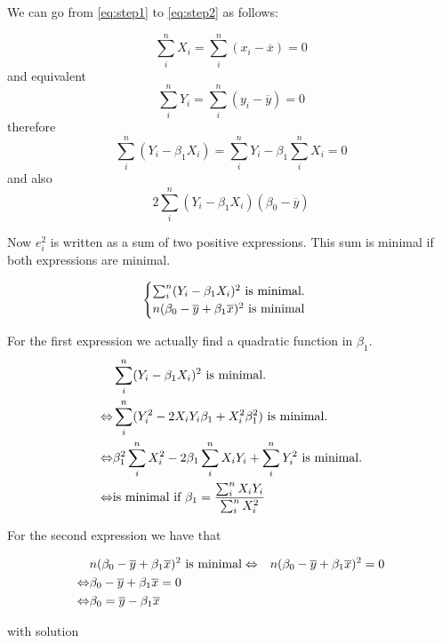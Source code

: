 \begin{theorem}
  We can go from \ref{eq:step1} to \ref{eq:step2} as follows:

  \[ \sum_{i}^{n}X_i = \sum_{i}^{n} (x_i - \overline{x}) = 0 \]
  and equivalent
  \[ \sum_{i}^{n}Y_i = \sum_{i}^{n} (y_i - \overline{y}) = 0 \]
  therefore
  \[ \sum_{i}^{n}(Y_i - \beta_1 X_i) = \sum_{i}^{n}Y_i - \beta_1 \sum_{i}^{n}X_i = 0 \]
  and also
  \[ 2 \sum_{i}^{n}(Y_i - \beta_1 X_i)(\beta_0 - \overline{y}) \]
  

  Now $e^{2}_{i}$ is written as a sum of two positive expressions. This sum is minimal if both expressions are minimal.

  \begin{equation}
    \begin{cases}
      \sum_{i}^{n}( Y_{i} - \beta_{1} X_{i})^{2} \textnormal{ is minimal.}\\
      n(\beta_{0} - \overline{y} + \beta_{1} \overline{x})^{2} \textnormal{ is minimal}
    \end{cases}
    \label{eq:vgl}
  \end{equation}


  For the first expression we actually find a quadratic function in $\beta_1$.
  \begin{eqnarray}
		& \sum_{i}^{n}( Y_{i} - \beta_{1} X_{i})^{2} \textnormal{ is minimal.} \label{eq:expression}\\
		\Leftrightarrow & \sum_i^n (Y_i^2 - 2X_iY_i\beta_1 + X_i^2\beta_1^2) \textnormal{ is minimal.} \\
		\Leftrightarrow & \beta_1^2 \sum_i^n X_i^2 - 2\beta_1 \sum_i^n X_iY_i + \sum_i^nY_i^2 \textnormal{ is minimal.} \\
		\Leftrightarrow & \textnormal{is minimal if } \beta_{1} = \frac{\sum_{i}^{n} X_{i}Y_{i}}{\sum_{i}^{n} X_{i}^{2}}
  \end{eqnarray}
  
  For the second expression we have that

  \begin{eqnarray}
		& n(\beta_{0} - \overline{y} + \beta_{1} \overline{x})^{2} \textnormal{ is minimal}
		\Leftrightarrow & n(\beta_{0} - \overline{y} + \beta_{1} \overline{x})^{2} = 0 \\
		\Leftrightarrow & \beta_{0} - \overline{y} + \beta_{1} \overline{x} = 0 \\
		\Leftrightarrow & \beta_{0} = \overline{y} - \beta_{1}\overline{x} 
  \end{eqnarray}
  

  with solution


\end{theorem}
